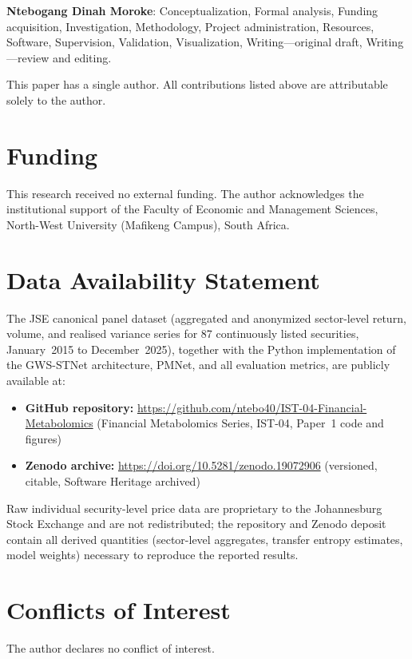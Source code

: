 \documentclass[11pt,a4paper]{article}  %
\theoremstyle{plain}
\theoremstyle{definition}
\theoremstyle{remark}
\begin{document}
\textbf{Ntebogang Dinah Moroke}: Conceptualization, Formal analysis,
Funding acquisition, Investigation, Methodology, Project administration,
Resources, Software, Supervision, Validation, Visualization,
Writing---original draft, Writing---review and editing.

This paper has a single author. All contributions listed above
are attributable solely to the author.

\section*{Funding}

This research received no external funding. The author acknowledges
the institutional support of the Faculty of Economic and Management
Sciences, North-West University (Mafikeng Campus), South Africa.

\section*{Data Availability Statement}

The JSE canonical panel dataset (aggregated and anonymized sector-level
return, volume, and realised variance series for 87 continuously listed
securities, January~2015 to December~2025), together with the
Python implementation of the GWS-STNet architecture, PMNet, and
all evaluation metrics, are publicly available at:
\begin{itemize}[leftmargin=2em]
  \item \textbf{GitHub repository:}
    \url{https://github.com/ntebo40/IST-04-Financial-Metabolomics}
    (Financial Metabolomics Series, IST-04, Paper~1 code and figures)
  \item \textbf{Zenodo archive:}
    \url{https://doi.org/10.5281/zenodo.19072906}
    (versioned, citable, Software Heritage archived)
\end{itemize}
Raw individual security-level price data are proprietary to the
Johannesburg Stock Exchange and are not redistributed; the
repository and Zenodo deposit contain all derived quantities
(sector-level aggregates, transfer entropy estimates, model
weights) necessary to reproduce the reported results.

\section*{Conflicts of Interest}

The author declares no conflict of interest.
\end{document}
